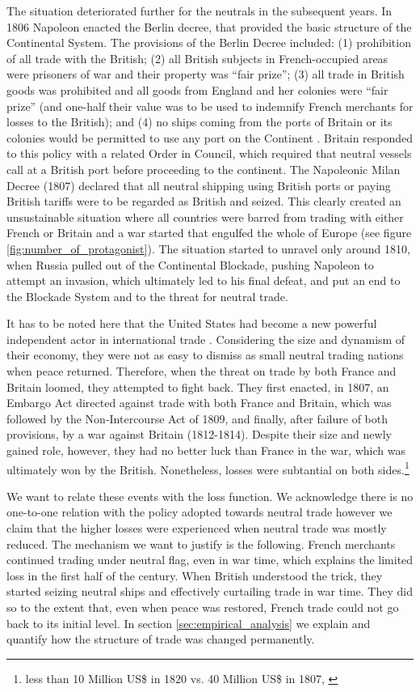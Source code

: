 \documentclass[12pt,a4paper,notitlepage,english]{article}
\begin{document}
The situation deteriorated further for the neutrals in the subsequent years.
In 1806 Napoleon enacted the Berlin decree, that provided the basic structure of the Continental System.
The provisions of the Berlin Decree included: (1) prohibition of all trade with the British; (2) all British subjects in French-occupied areas were prisoners of war and their property was ``fair prize''; (3) all trade in British goods was prohibited and all goods from England and her colonies were ``fair prize'' (and one-half their value was to be used to indemnify French merchants for losses to the British); and (4) no ships coming from the ports of Britain or its colonies would be permitted to use any port on the Continent \citep{Davis2006}.
Britain responded to this policy with a related Order in Council, which required that neutral vessels call at a British port before proceeding to the continent.
The Napoleonic Milan Decree (1807) declared that all neutral shipping using British ports or paying British tariffs were to be regarded as British and seized.
This clearly created an unsustainable situation where all countries were barred from trading with either French or Britain and a war started that engulfed the whole of Europe (see figure \ref{fig:number_of_protagonist}). The situation started to unravel only around 1810, when Russia pulled out of the Continental Blockade, pushing Napoleon to attempt an invasion, which ultimately led to his final defeat, and put an end to the Blockade System and to the threat for neutral trade. 

It has to be noted here that the United States had become a new powerful independent actor in international trade \citep{Cuenca-Esteban2014}. Considering the size and dynamism of their economy, they were not as easy to dismiss as small neutral trading nations when peace returned. Therefore, when the threat on trade by both France and Britain loomed, they attempted to fight back. They first enacted, in 1807, an Embargo Act directed against trade with both France and Britain, which was followed by the Non-Intercourse Act of 1809, and finally, after failure of both provisions, by a war against Britain (1812-1814). 
Despite their size and newly gained role, however, they had no better luck than France in the war, which was ultimately won by the British.
Nonetheless, losses were subtantial on both sides.\footnote{less than 10 Million US\$ in 1820 vs. 40 Million US\$ in 1807, \citep[tables A-4 and B-2]{North1960}}


We want to relate these events with the loss function. We acknowledge there is no one-to-one relation with the policy adopted towards neutral trade however we claim that the higher losses were experienced when neutral trade was mostly reduced. The mechanism we want to justify is the following. French merchants continued trading under neutral flag, even in war time, which explains the limited loss in the first half of the century. When British understood the trick, they started seizing neutral ships and effectively curtailing trade in war time. They did so to the extent that, even when peace was restored, French trade could not go back to its initial level. In section \ref{sec:empirical_analysis} we explain and quantify how the structure of trade was changed permanently.  
\end{document}
